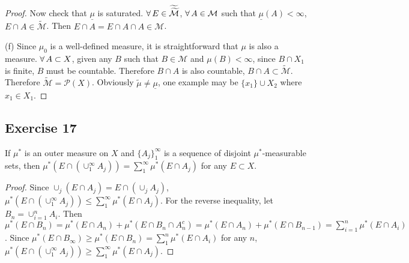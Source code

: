 \begin{proof}
    \par Now check that $\underline{\mu}$ is saturated. $\forall\, E\in\widetilde{\widetilde{\mathcal{M}}}$, $\forall\, A\in{\mathcal{M}}$ such that $\underline{\mu}(A)<\infty$, $E\cap A\in\widetilde{\mathcal{M}}$. Then $E\cap A=E\cap A\cap A\in\mathcal{M}$.
    \par(f) Since $\mu_0$ is a well-defined measure, it is straightforward that $\mu$ is also a measure. $\forall\, A\subset X$, given any $B$ such that $B\in\mathcal{M}$ and $\mu(B)<\infty$, since $B\cap X_1$ is finite, $B$ must be countable. Therefore $B\cap A$ is also countable, $B\cap A\subset\widetilde{\mathcal{M}}$. Therefore $\widetilde{\mathcal{M}}=\mathcal{P}(X)$. Obviously $\widetilde{\mu}\neq\underline{\mu}$, one example may be $\{x_1\}\cup X_2$ where $x_1\in X_1$.
\end{proof}
\subsection*{Exercise 17}
If $\mu^*$ is an outer measure on $X$ and $\{A_j\}_1^\infty$ is a sequence of disjoint $\mu^*$-measurable sets, then $\mu^*(E\cap(\cup^\infty_1A_j))=\sum^\infty_1\mu^*(E\cap A_j)$ for any $E\subset X$.
\begin{proof}
    Since $\cup_j(E\cap A_j)=E\cap(\cup_jA_j)$, $\mu^*(E\cap(\cup^\infty_1A_j))\le\sum^\infty_1\mu^*(E\cap A_j)$. For the reverse inequality, let $B_n=\cup_{i=1}^nA_i$. Then $\mu^*(E\cap B_n)=\mu^*(E\cap A_n)+\mu^*(E\cap B_n\cap A_n^c)=\mu^*(E\cap A_n)+\mu^*(E\cap B_{n-1})=\sum_{i=1}^n\mu^*(E\cap A_i)$. Since $\mu^*(E\cap B_\infty)\ge\mu^*(E\cap B_n)=\sum_1^n\mu^*(E\cap A_i)$ for any $n$, $\mu^*(E\cap(\cup^\infty_1A_j))\ge\sum^\infty_1\mu^*(E\cap A_j)$.
\end{proof}
